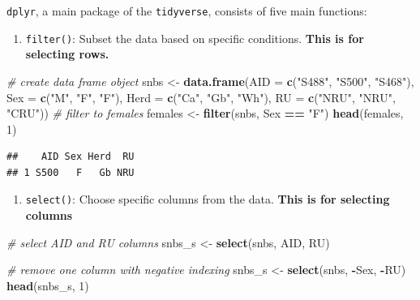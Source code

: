 \documentclass[
]{book}
\newenvironment{Shaded}{\begin{snugshade}}{\end{snugshade}}
\newcommand{\AttributeTok}[1]{\textcolor[rgb]{0.13,0.29,0.53}{#1}}
\newcommand{\CommentTok}[1]{\textcolor[rgb]{0.56,0.35,0.01}{\textit{#1}}}
\newcommand{\DecValTok}[1]{\textcolor[rgb]{0.00,0.00,0.81}{#1}}
\newcommand{\FunctionTok}[1]{\textcolor[rgb]{0.13,0.29,0.53}{\textbf{#1}}}
\newcommand{\NormalTok}[1]{#1}
\newcommand{\OtherTok}[1]{\textcolor[rgb]{0.56,0.35,0.01}{#1}}
\newcommand{\SpecialCharTok}[1]{\textcolor[rgb]{0.81,0.36,0.00}{\textbf{#1}}}
\newcommand{\StringTok}[1]{\textcolor[rgb]{0.31,0.60,0.02}{#1}}
\providecommand{\tightlist}{%
  \setlength{\itemsep}{0pt}\setlength{\parskip}{0pt}}
\begin{document}
\texttt{dplyr}, a main package of the \texttt{tidyverse}, consists of five main functions:

\begin{enumerate}
\def\labelenumi{\arabic{enumi}.}
\tightlist
\item
  \texttt{filter()}: Subset the data based on specific conditions. \textbf{This is for selecting rows.}
\end{enumerate}

\begin{Shaded}
\begin{Highlighting}[]
\CommentTok{\# create data frame object}
\NormalTok{snbs }\OtherTok{\textless{}{-}} \FunctionTok{data.frame}\NormalTok{(}\AttributeTok{AID =} \FunctionTok{c}\NormalTok{(}\StringTok{"S488"}\NormalTok{, }\StringTok{"S500"}\NormalTok{, }\StringTok{"S468"}\NormalTok{),}
                   \AttributeTok{Sex =} \FunctionTok{c}\NormalTok{(}\StringTok{"M"}\NormalTok{, }\StringTok{"F"}\NormalTok{, }\StringTok{"F"}\NormalTok{),}
                   \AttributeTok{Herd =} \FunctionTok{c}\NormalTok{(}\StringTok{"Ca"}\NormalTok{, }\StringTok{"Gb"}\NormalTok{, }\StringTok{"Wh"}\NormalTok{),}
                   \AttributeTok{RU =} \FunctionTok{c}\NormalTok{(}\StringTok{"NRU"}\NormalTok{, }\StringTok{"NRU"}\NormalTok{, }\StringTok{"CRU"}\NormalTok{))}
\CommentTok{\# filter to females}
\NormalTok{females }\OtherTok{\textless{}{-}} \FunctionTok{filter}\NormalTok{(snbs, Sex }\SpecialCharTok{==} \StringTok{"F"}\NormalTok{)}
\FunctionTok{head}\NormalTok{(females, }\DecValTok{1}\NormalTok{)}
\end{Highlighting}
\end{Shaded}

\begin{verbatim}
##    AID Sex Herd  RU
## 1 S500   F   Gb NRU
\end{verbatim}

\begin{enumerate}
\def\labelenumi{\arabic{enumi}.}
\setcounter{enumi}{1}
\tightlist
\item
  \texttt{select()}: Choose specific columns from the data. \textbf{This is for selecting columns}
\end{enumerate}

\begin{Shaded}
\begin{Highlighting}[]
\CommentTok{\# select AID and RU columns}
\NormalTok{snbs\_s }\OtherTok{\textless{}{-}} \FunctionTok{select}\NormalTok{(snbs, AID, RU)}

\CommentTok{\# remove one column with negative indexing}
\NormalTok{snbs\_s }\OtherTok{\textless{}{-}} \FunctionTok{select}\NormalTok{(snbs, }\SpecialCharTok{{-}}\NormalTok{Sex, }\SpecialCharTok{{-}}\NormalTok{RU)}
\FunctionTok{head}\NormalTok{(snbs\_s, }\DecValTok{1}\NormalTok{)}
\end{Highlighting}
\end{Shaded}
\end{document}
